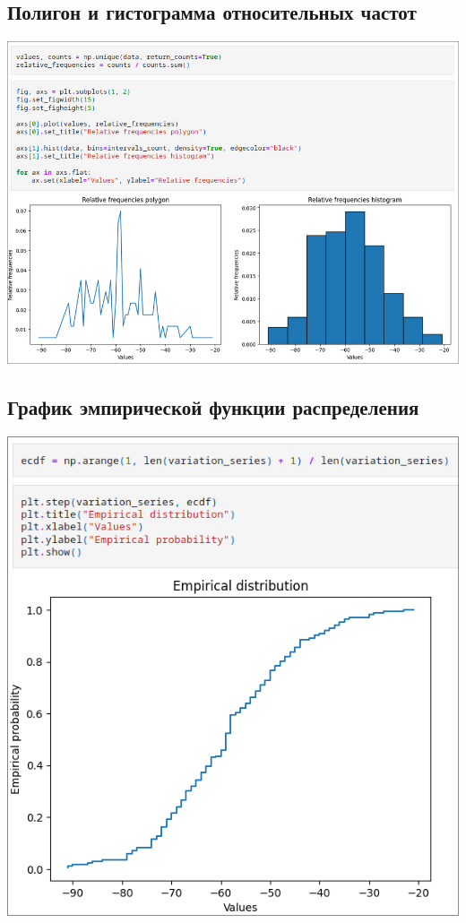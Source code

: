 \documentclass[a4paper]{article}
\begin{document}
    \subsection*{Полигон и гистограмма относительных частот}
    \includegraphics[width=\textwidth]{images/relative_frequencies.png}

    \subsection*{График эмпирической функции распределения}
    \includegraphics[width=\textwidth]{images/empirical_distribution.png}
\end{document}
